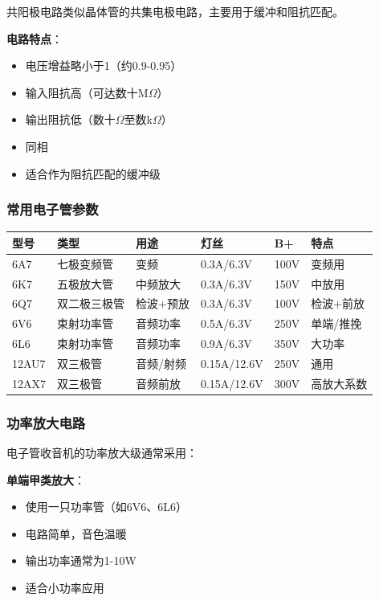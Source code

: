 共阳极电路类似晶体管的共集电极电路，主要用于缓冲和阻抗匹配。

\textbf{电路特点}：
\begin{itemize}
    \item 电压增益略小于1（约0.9-0.95）
    \item 输入阻抗高（可达数十M$\Omega$）
    \item 输出阻抗低（数十$\Omega$至数k$\Omega$）
    \item 同相
    \item 适合作为阻抗匹配的缓冲级
\end{itemize}

\subsubsection{常用电子管参数}
\label{sec:tube_parameters}

\begin{center}
\begin{tabular}{|p{2cm}|p{3cm}|p{3cm}|p{3cm}|p{2cm}|p{3cm}|}
\hline
\textbf{型号} & \textbf{类型} & \textbf{用途} & \textbf{灯丝} & \textbf{B+} & \textbf{特点} \\
\hline
6A7 & 七极变频管 & 变频 & 0.3A/6.3V & 100V & 变频用 \\
6K7 & 五极放大管 & 中频放大 & 0.3A/6.3V & 150V & 中放用 \\
6Q7 & 双二极三极管 & 检波+预放 & 0.3A/6.3V & 100V & 检波+前放 \\
6V6 & 束射功率管 & 音频功率 & 0.5A/6.3V & 250V & 单端/推挽 \\
6L6 & 束射功率管 & 音频功率 & 0.9A/6.3V & 350V & 大功率 \\
12AU7 & 双三极管 & 音频/射频 & 0.15A/12.6V & 250V & 通用 \\
12AX7 & 双三极管 & 音频前放 & 0.15A/12.6V & 300V & 高放大系数 \\
\hline
\end{tabular}
\end{center}

\subsubsection{功率放大电路}
\label{sec:tube_power_amplifier}

电子管收音机的功率放大级通常采用：

\textbf{单端甲类放大}：
\begin{itemize}
    \item 使用一只功率管（如6V6、6L6）
    \item 电路简单，音色温暖
    \item 输出功率通常为1-10W
    \item 适合小功率应用
\end{itemize}

